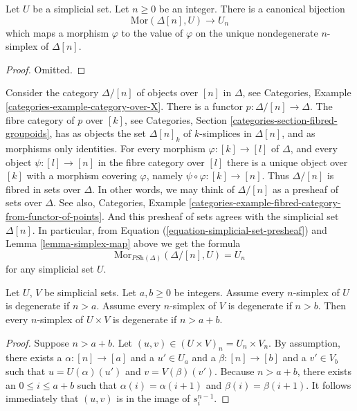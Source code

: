\begin{lemma}
\label{lemma-simplex-map}
Let $U$ be a simplicial set. Let $n \geq 0$ be an integer.
There is a canonical bijection
$$
\text{Mor}(\Delta[n], U)
\longrightarrow
U_n
$$
which maps a morphism $\varphi$ to the value of $\varphi$
on the unique nondegenerate $n$-simplex of $\Delta[n]$.
\end{lemma}

\begin{proof}
Omitted.
\end{proof}

\begin{example}
\label{example-simplex-category}
Consider the category $\Delta/[n]$ of objects over $[n]$
in $\Delta$, see
Categories, Example \ref{categories-example-category-over-X}.
There is a functor $p : \Delta/[n] \to \Delta$.
The fibre category of $p$ over $[k]$, see
Categories, Section \ref{categories-section-fibred-groupoids},
has as objects the
set $\Delta[n]_k$ of $k$-simplices in $\Delta[n]$, and as
morphisms only identities. For every morphism
$\varphi : [k] \to [l]$ of $\Delta$, and every object $\psi : [l] \to [n]$
in the fibre category over $[l]$ there is a unique
object over $[k]$ with a morphism covering $\varphi$, namely
$\psi \circ \varphi : [k] \to [n]$. Thus $\Delta/[n]$
is fibred in sets over $\Delta$. In other words, we may
think of $\Delta/[n]$ as a presheaf of sets over $\Delta$.
See also, Categories,
Example \ref{categories-example-fibred-category-from-functor-of-points}.
And this presheaf of sets agrees with the simplicial set
$\Delta[n]$. In particular, from Equation
(\ref{equation-simplicial-set-presheaf}) and
Lemma \ref{lemma-simplex-map} above
we get the formula
$$
\text{Mor}_{\textit{PSh}(\Delta)}(\Delta/[n], U) = U_n
$$
for any simplicial set $U$.
\end{example}

\begin{lemma}
\label{lemma-product-degenerate}
Let $U$, $V$ be simplicial sets.
Let $a, b \geq 0$ be integers.
Assume every $n$-simplex of $U$ is degenerate if $n > a$.
Assume every $n$-simplex of $V$ is degenerate if $n > b$.
Then every $n$-simplex of $U \times V$ is degenerate
if $n > a + b$.
\end{lemma}

\begin{proof}
Suppose $n > a + b$. Let $(u, v) \in (U\times V)_n = U_n \times V_n$.
By assumption, there exists a $\alpha : [n] \to [a]$ and a
$u' \in U_a$ and a $\beta : [n] \to [b]$ and a $v' \in V_b$
such that $u = U(\alpha)(u')$ and $v = V(\beta)(v')$. Because
$n > a + b$, there exists an $0 \leq i \leq a + b$ such that
$\alpha(i) = \alpha(i + 1)$ and
$\beta(i) = \beta(i + 1)$. It follows immediately
that $(u, v)$ is in the image of $s^{n - 1}_i$.
\end{proof}








